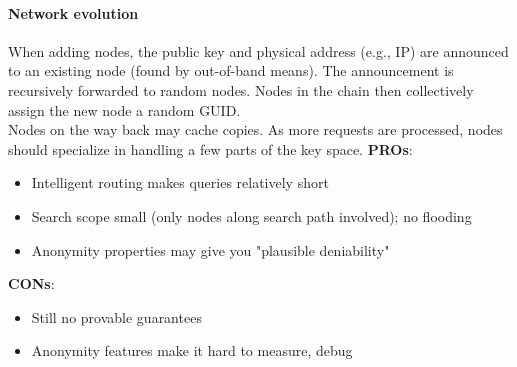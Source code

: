 \documentclass[10pt,a4paper]{article}
\begin{document}
\paragraph{Network evolution}
When adding nodes, the public key and physical address (e.g., IP) are announced to an existing node (found by out-of-band means). The announcement is recursively forwarded to random nodes. Nodes in the chain then collectively assign the new node a random GUID.
\\ Nodes on the way back may cache copies. As more requests are processed, nodes should specialize in handling a few parts of the key space.
\textbf{PROs}:
\begin{itemize}
	\item Intelligent routing makes queries relatively short
	\item Search scope small (only nodes along search path involved); no flooding
	\item Anonymity properties may give you "plausible deniability"
\end{itemize}
\textbf{CONs}:
\begin{itemize}
	\item Still no provable guarantees
	\item Anonymity features make it hard to measure, debug
\end{itemize}
\end{document}
